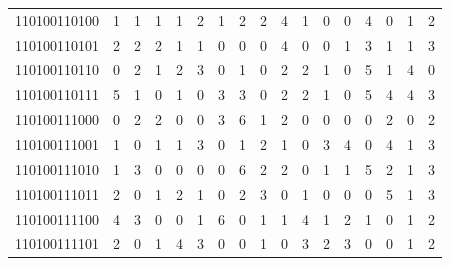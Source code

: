 \documentclass[10pt,a4paper]{article}
\begin{document}
\begin{longtable}{ |c|c|c|c|c|c|c|c|c|c|c|c|c|c|c|c|c| }
    110100110100              & 1                            & 1                                & 1                            & 1                              & 2   & 1   & 2   & 2   & 4   & 1   & 0   & 0   & 4   & 0   & 1   & 2   \\
    110100110101              & 2                            & 2                                & 2                            & 1                              & 1   & 0   & 0   & 0   & 4   & 0   & 0   & 1   & 3   & 1   & 1   & 3   \\
    110100110110              & 0                            & 2                                & 1                            & 2                              & 3   & 0   & 1   & 0   & 2   & 2   & 1   & 0   & 5   & 1   & 4   & 0   \\
    110100110111              & 5                            & 1                                & 0                            & 1                              & 0   & 3   & 3   & 0   & 2   & 2   & 1   & 0   & 5   & 4   & 4   & 3   \\
    110100111000              & 0                            & 2                                & 2                            & 0                              & 0   & 3   & 6   & 1   & 2   & 0   & 0   & 0   & 0   & 2   & 0   & 2   \\
    110100111001              & 1                            & 0                                & 1                            & 1                              & 3   & 0   & 1   & 2   & 1   & 0   & 3   & 4   & 0   & 4   & 1   & 3   \\
    110100111010              & 1                            & 3                                & 0                            & 0                              & 0   & 0   & 6   & 2   & 2   & 0   & 1   & 1   & 5   & 2   & 1   & 3   \\
    110100111011              & 2                            & 0                                & 1                            & 2                              & 1   & 0   & 2   & 3   & 0   & 1   & 0   & 0   & 0   & 5   & 1   & 3   \\
    110100111100              & 4                            & 3                                & 0                            & 0                              & 1   & 6   & 0   & 1   & 1   & 4   & 1   & 2   & 1   & 0   & 1   & 2   \\
    110100111101              & 2                            & 0                                & 1                            & 4                              & 3   & 0   & 0   & 1   & 0   & 3   & 2   & 3   & 0   & 0   & 1   & 2   \\

\end{longtable}
\end{document}
